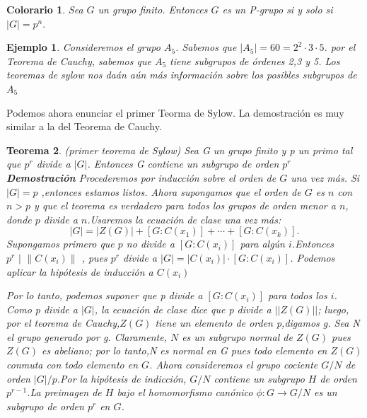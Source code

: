 \documentclass{article}
\newcounter{Teorema}
\numberwithin{equation}{section}
\theoremstyle{plain}  %
\newtheorem{thm}{Teorema}[section]
\newtheorem{Corol}[thm]{Colorario}
\newtheorem{Ej}{Ejemplo}[section]
\providecommand{\abs}[1]{\lvert#1\rvert} %
\providecommand{\norm}[1]{\lVert#1\rVert} %
\begin{document}
\begin{Corol}
Sea $G$ un grupo finito. Entonces $G$ es un P-grupo si y solo si $\abs{G} = p^{n}.$
\end{Corol}
\begin{Ej}
Consideremos el grupo $A_{5}$. Sabemos que $\abs{A_{5}}= 60 = 2^{2}\cdot 3 \cdot 5$. por el Teorema de Cauchy, sabemos que $A_{5}$ tiene subgrupos de órdenes 2,3 y 5. Los teoremas de sylow nos daán aún más información sobre los posibles subgrupos de $A_{5}$
\end{Ej}
\vspace{5mm}
Podemos ahora enunciar el primer Teorma de Sylow. La demostración es muy similar a la del Teorema de Cauchy. 
\vspace{5mm}

\begin{thm}
(primer teorema de Sylow) Sea G un grupo finito y p un primo tal que $p^{r}$ divide a $\abs{G}$. Entonces G contiene un subgrupo de orden $p^{r}$
\vspace{5mm}
\textbf{Demostración} 
\vspace{5mm} Procederemos por inducción sobre el orden de   $G $  una vez más.
Si $\abs{G}=p$ ,entonces estamos listos. Ahora supongamos que el orden de $G$ es $n$ con 
$n > p$ y que el teorema es verdadero para todos los grupos de orden menor a $n$, donde $p$
divide a $n$.Usaremos la ecuación de clase una vez más: 
\begin{equation*}
    \abs{G}= \abs{Z(G)} + [G:C(x_{1})] + \cdots + [G:C(x_{k})].
\end{equation*}
Supongamos primero que $p$ no divide a $[G:C(x_{i})]$ para algún $i$.Entonces
$p^{r}\text{ | }\norm{C(x _{i})}$ , pues $p^{r}$ divide a 
$\abs{G} = \abs{C(x_{i})}\cdot [G:C(x_{i})]$. Podemos aplicar la hipótesis de inducción a $C(x_{i})$

\vspace{5mm}

Por lo tanto, podemos suponer que p divide a $[G:C(x_{i})]$ para todos los $i$.
Como p divide a $\abs{G}$, la ecuación de clase dice que p divide a $\abs{\abs{Z(G)}}$; 
luego, por el teorema de Cauchy,$Z(G)$ tiene un elemento de orden p,digamos g.
Sea N el grupo generado por g. Claramente, $N$ es un subgrupo normal de $Z(G)$   
pues  $Z(G)$ es abeliano; por lo tanto,N es normal en G pues todo elemento en $Z(G)$ 
conmuta con todo elemento en $G$. Ahora consideremos el grupo cociente $G/N$ de orden 
$\abs{G}/p$.Por la hipótesis de indicción, $G / N$ contiene un subgrupo $H $ de orden
$p^{r-1} $.La preimagen de $H$ bajo el homomorfismo canónico $\phi :G → G / N$ es un 
subgrupo de orden $p^{r}$ en $G$.
\end{thm}
\end{document}
